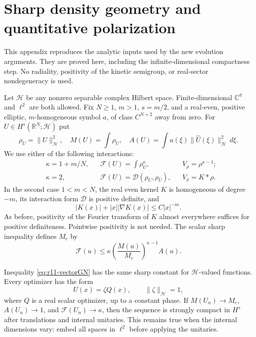 \section{Sharp density geometry and quantitative polarization}
\label{sec:r12-polarization-foundation}
This appendix reproduces the analytic inputs used by the new evolution
arguments. They are proved here, including the infinite-dimensional
compactness step. No radiality, positivity of the kinetic semigroup,
or real-sector nondegeneracy is used.

Let $\mathcal H$ be any nonzero separable complex Hilbert space.
Finite-dimensional $\mathbb C^d$ and $\ell^2$ are both allowed.
Fix $N\ge1$, $m>1$, $s=m/2$, and a real-even, positive elliptic,
$m$-homogeneous symbol $a$, of class $C^{N+2}$ away from zero.
For $U\in H^s(\mathbb R^N;\mathcal H)$ put
\[
 \rho_U=\|U\|_{\mathcal H}^2,\quad
 M(U)=\int\rho_U,\quad
 A(U)=\int a(\xi)\|\widehat U(\xi)\|_{\mathcal H}^2\,d\xi.
\]
We use either of the following interactions:
\begin{align*}
 &\kappa=1+m/N,
 &&\mathcal F(U)=\int\rho_U^\kappa,
 &&V_\rho=\rho^{\kappa-1};\\
 &\kappa=2,
 &&\mathcal F(U)=\mathcal D(\rho_U,\rho_U),
 &&V_\rho=K*\rho.
\end{align*}
In the second case $1<m<N$, the real even kernel $K$ is homogeneous
of degree $-m$, its interaction form $\mathcal D$ is positive definite,
and
\[
 |K(x)|+|x||\nabla K(x)|\le C|x|^{-m}.
\]
As before, positivity of the Fourier transform of $K$ almost everywhere
suffices for positive definiteness. Pointwise positivity is not needed.
The scalar sharp inequality defines $M_c$ by
\begin{equation}\label{eq:r11-vectorGN}
 \mathcal F(u)\le\kappa
       \left(\frac{M(u)}{M_c}\right)^{\kappa-1}A(u).
\end{equation}

\begin{theorem}
\label{thm:r11-vectorcompact}
Inequality \eqref{eq:r11-vectorGN} has the same sharp constant for
$\mathcal H$-valued functions. Every optimizer has the form
\[
 U(x)=\zeta Q(x),\qquad \|\zeta\|_{\mathcal H}=1,
\]
where $Q$ is a real scalar optimizer, up to a constant phase.
If $M(U_n)\to M_c$, $A(U_n)\to1$, and
$\mathcal F(U_n)\to\kappa$, then the sequence is strongly compact
in $H^s$ after translations and internal unitaries. This remains
true when the internal dimensions vary: embed all spaces in
$\ell^2$ before applying the unitaries.
\end{theorem}

